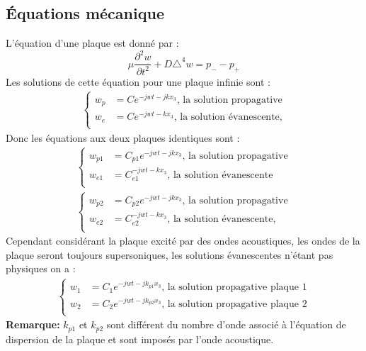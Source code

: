 \documentclass[12pt,foolscap]{report}
\begin{document}
	\subsection*{Équations mécanique}
	L'équation d'une plaque est donné par : 	
	\begin{equation}
	\mu \frac{\partial^2w}{\partial t^2}+D\triangle^4w = p_- -p_+
	\end{equation}
	Les solutions de cette équation pour une plaque infinie sont : 
	\begin{align}
	\begin{cases}
	w_p &= Ce^{-jwt-jkx_3} \text{, la solution propagative}\\
	w_e &= Ce^{-jwt-kx_3}\text{, la solution évanescente,}\\
	\end{cases}
	\end{align}
	Donc les équations aux deux plaques identiques sont : 
	\begin{align}
	\begin{cases}
	w_{p1} &= C_{p1}e^{-jwt-jkx_3} \text{, la solution propagative}\\
	w_{e1} &= C_{e1}^{-jwt-kx_3}\text{, la solution évanescente}\\
	\end{cases}\\
	\begin{cases}
	w_{p2} &= C_{p2}e^{-jwt-jkx_3} \text{, la solution propagative}\\
	w_{e2} &= C_{e2}^{-jwt-kx_3}\text{, la solution évanescente,}\\
	\end{cases}
	\end{align}
	Cependant considérant la plaque excité par des ondes acoustiques, les ondes de la plaque seront toujours supersoniques, les solutions évanescentes n'étant pas physiques on a :
	\begin{align}
	\begin{cases}
	w_{1} &= C_{1}e^{-jwt-jk_{p1}x_3} \text{, la solution propagative plaque 1}\\
	w_{2} &= C_{2}e^{-jwt-jk_{p2}x_3} \text{, la solution propagative plaque 2}\\
	\end{cases}
	\end{align}
	\textbf{Remarque:} $k_{p1}$ et $k_{p2}$ sont différent du nombre d'onde associé à l'équation de dispersion de la plaque et sont imposés par l'onde acoustique.
\end{document}
